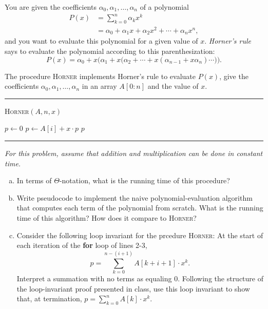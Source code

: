 \documentclass[11pt]{article}
\begin{document}
    \newpage
    \begin{tcolorbox}[title={Problem 4 (30 pts)}]
        You are given the coefficients $\alpha_0,\alpha_1,\ldots,\alpha_n$ of a polynomial
        \begin{align*}
            P(x) &= \sum_{k=0}^n \alpha_k x^k\\
            &= \alpha_0+\alpha_1x+\alpha_2x^2+\cdots+\alpha_nx^n,
        \end{align*}
        and you want to evaluate this polynomial for a given value of $x$. \emph{Horner's rule} says to evaluate the polynomial according to this parenthesization:
        \[
            P(x) = \alpha_0 + x \bigg(\alpha_1+x\Big(\alpha_2 +\cdots + x\left(\alpha_{n-1}+x\alpha_n\right)\cdots\Big)\bigg).
        \]
        
        The procedure \textsc{Horner} implements Horner's rule to evaluate $P(x)$, give the coefficients $\alpha_0,\alpha_1,\ldots,\alpha_n$ in an array $A[0:n]$ and the value of $x$.
        \bigskip
        
        \par\noindent\rule{\textwidth}{0.4pt}
        \smallskip        
        \textsc{Horner}$(A,n,x)$
        \begin{algorithmic}[1]
            \STATE $p\gets 0$
                \STATE $p \gets A[i]+x\cdot p$
            \ENDFOR
            \RETURN $p$
        \end{algorithmic}
        \vspace{-2mm}
        \par\noindent\rule{\textwidth}{0.4pt}
        
        {\it For this problem, assume that addition and multiplication can be done in constant time.}
        \begin{enumerate}[(a)]
            \item In terms of $\Theta$-notation, what is the running time of this procedure?
            \item Write pseudocode to implement the naive polynomial-evaluation algorithm that computes each term of the polynomial from scratch. What is the running time of this algorithm? How does it compare to \textsc{Horner}?
            \item Consider the following loop invariant for the prcedure \textsc{Horner}:\newline
            At the start of each iteration of the {\bf for} loop of lines 2-3,
            \[
            p = \sum_{k=0}^{n-(i+1)} A[k+i+1]\cdot x^k.
            \]
            Interpret a summation with no terms as equaling 0. Following the structure of the loop-invariant proof presented in class, use this loop invariant to show that, at termination, $p = \sum_{k=0}^n A[k] \cdot x^k$.
        \end{enumerate}
        
    \end{tcolorbox}
\end{document}
